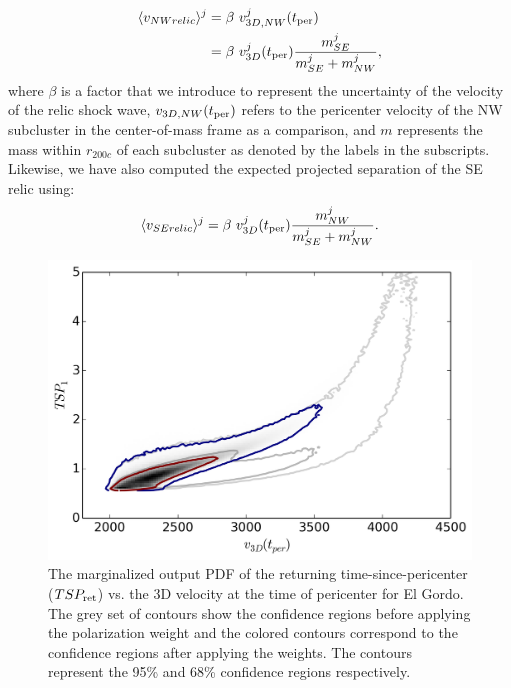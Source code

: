 \documentclass[letterpaper,useAMS,usenatbib]{mn2e}
\begin{document}
\begin{align}
	\label{eqn:NW_speed}
	\langle v_{NW relic} \rangle^j &= \beta~v^j_{3D, NW}(t_{\rm per}) \\
	&= \beta~v^j_{3D}(t_{\rm per}) \frac{m^j_{SE}}{m^j_{SE} + m^j_{NW}}, 
\end{align}
where  $\beta$ is a factor that we introduce to represent the
uncertainty of the velocity of the relic shock wave, $v_{3D, NW}(t_{\rm per})$ 
refers to the pericenter velocity of
the NW subcluster in the center-of-mass frame as a comparison, and $m$
represents the mass within $r_{200c}$ of each subcluster as denoted by the
labels in the subscripts. 
Likewise, we have also computed the expected projected separation of the SE
relic using:  
\begin{equation}
	\label{eqn:SE_speed}
	\langle v_{SE relic} \rangle^j = \beta~v^j_{3D}(t_{\rm per}) \frac{m^j_{NW}}{m^j_{SE} + m^j_{NW}}. 
\end{equation}
\par 
\begin{figure}
	\includegraphics[width=\linewidth]{TwoMnWBSG_2contour2d.png}
	\caption{The marginalized output PDF of the returning time-since-pericenter
($TSP_{\rm ret}$) vs. the 3D velocity at the time of pericenter for El Gordo. The
grey set of contours show the confidence regions before applying the
polarization weight and the colored contours correspond to the confidence
regions after applying the weights. The contours represent the 95\% and
68\% confidence regions respectively. }
	\label{fig:TSP_v3D}
\end{figure}
\end{document}
